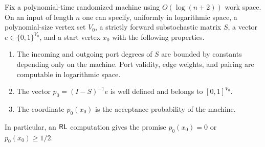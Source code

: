 \begin{lemma}\label{lem:model-reduction}
Fix a polynomial-time randomized machine using $O(\log(n+2))$ work
space. On an input of length $n$ one can specify, uniformly in
logarithmic space, a polynomial-size vertex set $V_0$, a strictly
forward substochastic matrix $S$, a vector
$e\in\{0,1\}^{V_0}$, and a start vertex $x_0$ with the following
properties.
\begin{enumerate}
\item The incoming and outgoing port degrees of $S$ are bounded by
constants depending only on the machine. Port validity, edge weights,
and pairing are computable in logarithmic space.
\item The vector $p_0=(I-S)^{-1}e$ is well defined and belongs to
$[0,1]^{V_0}$.
\item The coordinate $p_0(x_0)$ is the acceptance probability of
the machine.
\end{enumerate}
In particular, an $\mathsf{RL}$ computation gives the promise
$p_0(x_0)=0$ or $p_0(x_0)\ge1/2$.
\end{lemma}

